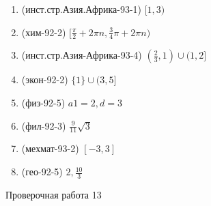 \documentclass[11pt,a5paper]{report}
\begin{document}
\newpage

\begin{enumerate}

\item (инст.стр.Азия.Африка-93-1) $[1, 3)$

\item (хим-92-2) $[\frac{\pi}{2}+2\pi n, \frac{3}{4}\pi +2\pi n)$

\item (инст.стр.Азия-Африка-93-4) $(\frac{2}{3}, 1)\cup(1, 2]$

\item (экон-92-2) $\{1\}\cup(3, 5]$

\item (физ-92-5) $a1=2, d=3$

\item (фил-92-3) $\frac{9}{11}\sqrt{3}$

\item (мехмат-93-2) $[-3, 3]$

\item (гео-92-5) $2, \frac{10}{3}$

\end{enumerate}

\newpage

\begin{center}
Проверочная работа 13


\end{center}
\end{document}
